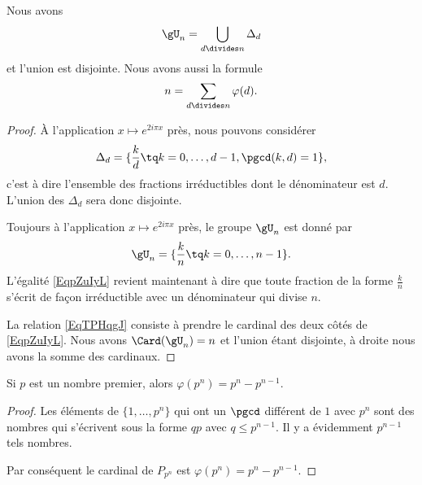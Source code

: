 \begin{lemma}       \label{LemKcpjee}
    Nous avons
    \begin{equation}        \label{EqpZuIyL}
        \gU_n=\bigcup_{d\divides n}\Delta_d
    \end{equation}
    et l'union est disjointe. Nous avons aussi la formule
    \begin{equation}        \label{EqTPHqgJ}
        n=\sum_{d\divides n}\varphi(d).
    \end{equation}
\end{lemma}

\begin{proof}
    À l'application \( x\mapsto  e^{2i\pi x}\) près, nous pouvons considérer
    \begin{equation}
        \Delta_d=\{ \frac{ k }{ d }\tq k=0,\ldots, d-1, \pgcd(k,d)=1 \},
    \end{equation}
    c'est à dire l'ensemble des fractions irréductibles dont le dénominateur est \( d\). L'union des \( \Delta_d\) sera donc disjointe.
    
    Toujours à l'application \( x\mapsto  e^{2i\pi x}\) près, le groupe \( \gU_n\) est donné par
    \begin{equation}
        \gU_n=\{ \frac{ k }{ n }\tq k=0,\ldots, n-1 \}.
    \end{equation}
    L'égalité \eqref{EqpZuIyL} revient maintenant à dire que toute fraction de la forme \( \frac{ k }{ n }\) s'écrit de façon irréductible avec un dénominateur qui divise \( n\).

    La relation \eqref{EqTPHqgJ} consiste à prendre le cardinal des deux côtés de \eqref{EqpZuIyL}. Nous avons \( \Card(\gU_n)=n\) et l'union étant disjointe, à droite nous avons la somme des cardinaux.
\end{proof}

\begin{lemma}
    Si \( p\) est un nombre premier, alors \( \varphi(p^n)=p^n-p^{n-1}\).
\end{lemma}

\begin{proof}
    Les éléments de \( \{ 1,\ldots,p^n \}\) qui ont un \( \pgcd\) différent de \( 1\) avec \( p^n\) sont des nombres qui s'écrivent sous la forme \( qp\) avec \( q\leq p^{n-1}\). Il y a évidemment \( p^{n-1}\) tels nombres.

    Par conséquent le cardinal de \( P_{p^n}\) est \( \varphi(p^{n})=p^n-p^{n-1}\).
\end{proof}

